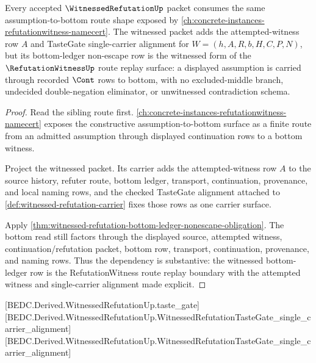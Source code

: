 \begin{theorem}
\label{thm:witnessed-refutation-refutationwitness-dependency-boundary}
Every accepted $\WitnessedRefutationUp$ packet consumes the same assumption-to-bottom route shape exposed by \autoref{ch:concrete-instances-refutationwitness-namecert}. The witnessed packet adds the attempted-witness row $A$ and TasteGate single-carrier alignment for $W=(h,A,R,b,H,C,P,N)$, but its bottom-ledger non-escape row is the witnessed form of the $\RefutationWitnessUp$ route replay surface: a displayed assumption is carried through recorded $\Cont$ rows to bottom, with no excluded-middle branch, undecided double-negation eliminator, or unwitnessed contradiction schema.
\end{theorem}
\begin{proof}
Read the sibling route first. \autoref{ch:concrete-instances-refutationwitness-namecert} exposes the constructive assumption-to-bottom surface as a finite route from an admitted assumption through displayed continuation rows to a bottom witness.

Project the witnessed packet. Its carrier adds the attempted-witness row $A$ to the source history, refuter route, bottom ledger, transport, continuation, provenance, and local naming rows, and the checked TasteGate alignment attached to \autoref{def:witnessed-refutation-carrier} fixes those rows as one carrier surface.

Apply \autoref{thm:witnessed-refutation-bottom-ledger-nonescape-obligation}. The bottom read still factors through the displayed source, attempted witness, continuation/refutation packet, bottom row, transport, continuation, provenance, and naming rows. Thus the dependency is substantive: the witnessed bottom-ledger row is the RefutationWitness route replay boundary with the attempted witness and single-carrier alignment made explicit.
\end{proof}

[BEDC.Derived.WitnessedRefutationUp.taste\_gate]
[BEDC.Derived.WitnessedRefutationUp.WitnessedRefutationTasteGate\_single\_carrier\_alignment]
[BEDC.Derived.WitnessedRefutationUp.WitnessedRefutationTasteGate\_single\_carrier\_alignment]

